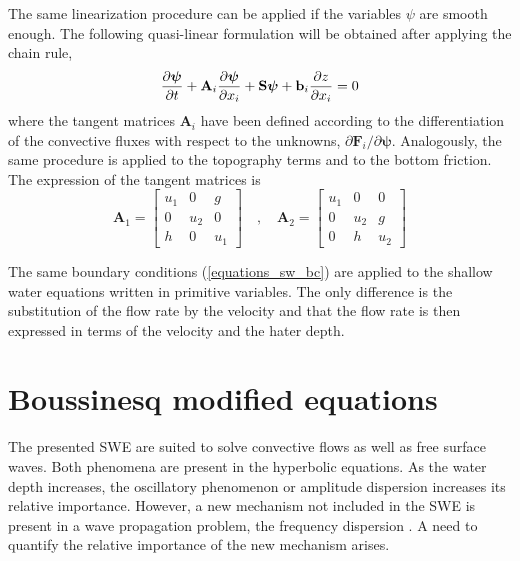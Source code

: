 The same linearization procedure can be applied if the variables $\psi$ are smooth enough. The following quasi-linear formulation will be obtained after applying the chain rule,
\begin{equation}
    \frac{\partial\bm\psi}{\partial t} + \mathbf{A}_i\frac{\partial\bm\psi}{\partial x_i} + \mathbf{S}\bm{\psi} + \mathbf{b}_i\frac{\partial z}{\partial x_i} = 0
\end{equation}
where the tangent matrices $\mathbf{A}_i$ have been defined according to the differentiation of the convective fluxes with respect to the unknowns, $\partial\mathbf{F}_i/\partial\bm{\psi}$. 
Analogously, the same procedure is applied to the topography terms and to the bottom friction. The expression of the tangent matrices is
\begin{equation}
    \mathbf{A}_1 = \left[\begin{array}{ccc}
        u_1 &  0  &  g  \\
         0  & u_2 &  0  \\
         h  &  0  & u_1
    \end{array}\right] \quad , \quad
    \mathbf{A}_2 = \left[\begin{array}{ccc}
        u_1 &  0  &  0  \\
         0  & u_2 &  g  \\
         0  &  h  & u_2
    \end{array}\right]
\end{equation}


The same boundary conditions (\ref{equations_sw_bc}) are applied to the shallow water equations written in primitive variables. The only difference is the substitution of the flow rate by the velocity and that the flow rate is then expressed in terms of the velocity and the hater depth.







\section{Boussinesq modified equations}
\label{equations_bsq}


The presented SWE are suited to solve convective flows as well as free surface waves. Both phenomena are present in the hyperbolic equations. As the water depth increases, the oscillatory phenomenon or amplitude dispersion increases its relative importance.
However, a new mechanism not included in the SWE is present in a wave propagation problem, the frequency dispersion \cite{ursell1953}. A need to quantify the relative importance of the new mechanism arises.

